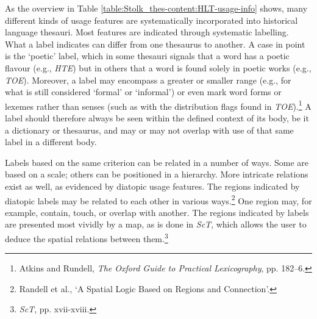 As the overview in Table \ref{table:Stolk_thes-content:HLT-usage-info} shows, many different kinds of usage features are systematically incorporated into historical language thesauri. 
Most features are indicated through systematic labelling. What a label indicates can differ from one thesaurus to another. A case in point is the `poetic' label, which in some thesauri signals that a word has a poetic flavour (e.g., \textit{HTE}) but in others that a word is found solely in poetic works (e.g., \textit{TOE}). Moreover, a label may encompass a greater or smaller range (e.g., for what is still considered `formal' or `informal') or even mark word forms or lexemes rather than senses (such as with the distribution flags found in \textit{TOE}).\footnote{Atkins and Rundell, \textit{The Oxford Guide to Practical Lexicography}, pp. 182–6.} A label should therefore always be seen within the defined context of its body, be it a dictionary or thesaurus, and may or may not overlap with use of that same label in a different body. %

Labels based on the same criterion can be related in a number of ways. Some are based on a scale; others can be positioned in a hierarchy. More intricate relations exist as well, as evidenced by diatopic usage features. The regions indicated by diatopic labels may be related to each other in various ways.\footnote{Randell et al., `A Spatial Logic Based on Regions and Connection'.} %
One region may, for example, contain, touch, or overlap with another. The regions indicated by labels are presented most vividly by a map, as is done in \textit{ScT}, which allows the user to deduce the spatial relations between them.\footnote{\textit{ScT}, pp. xvii-xviii.}



